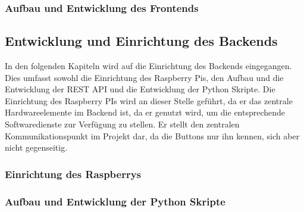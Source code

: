 \subsubsection{Aufbau und Entwicklung des Frontends}  
\label{sec:Aufbau und Entwicklung des Frontends-1}

\newpage

\subsection{Entwicklung und Einrichtung des Backends}  
\label{sec:Entwicklung und Einrichtung des Backends-1} 

In den folgenden Kapiteln wird auf die Einrichtung des Backends eingegangen. Dies umfasst sowohl die Einrichtung des Raspberry Pis, den Aufbau und die Entwicklung der REST API und die Entwicklung der Python Skripte. Die Einrichtung des Raspberry PIs wird an dieser Stelle geführt, da er das zentrale Hardwareelemente im Backend ist, da er genutzt wird, um die entsprechende Softwaredienste zur Verfügung zu stellen. Er stellt den zentralen Kommunikationspunkt im Projekt dar, da die Buttons nur ihn kennen, sich aber nicht gegenseitig. 

\subsubsection{Einrichtung des Raspberrys}  
\label{sec:Einrichtung des Raspberrys-1}



\subsubsection{Aufbau und Entwicklung der Python Skripte}  
\label{sec:Aufbau und Entwicklung der Python Skripte-1}



\newpage